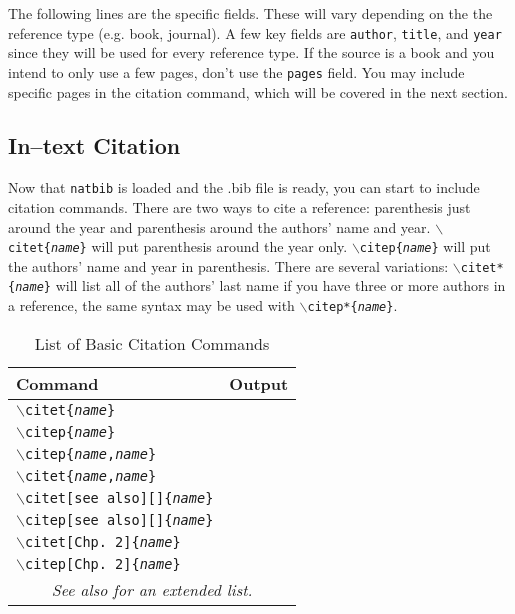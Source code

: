 \documentclass{article}
\begin{document}
The following lines are the specific fields. These will vary depending on the the reference type (e.g. book, journal). A few key fields are \texttt{author}, \texttt{title}, and \texttt{year} since they will be used for every reference type. If the source is a book and you intend to only use a few pages, don't use the \texttt{pages} field. You may include specific pages in the citation command, which will be covered in the next section.

\subsection{In--text Citation}

Now that \texttt{natbib} is loaded and the .bib file is ready, you can start to include citation commands. There are two ways to cite a reference: parenthesis just around the year and parenthesis around the authors' name and year. \texttt{$\backslash$citet\{\textit{name}\}} will put parenthesis around the year only. \texttt{$\backslash$citep\{\textit{name}\}} will put the authors' name and year in parenthesis. There are several variations: \texttt{$\backslash$citet*\{\textit{name}\}} will list all of the authors' last name if you have three or more authors in a reference, the same syntax may be used with \texttt{$\backslash$citep*\{\textit{name}\}}.

\begin{table}[!t]\caption{List of Basic Citation Commands}\label{tbl:cite}
	\begin{tabular}{|l|l|}
	\hline
	Command				& Output \\
	\hline
	\texttt{$\backslash$citet\{\textit{name}\}}								& \citet{Smith01} \\
	\hline
	\texttt{$\backslash$citep\{\textit{name}\}}								& \citep{Smith01} \\
	\hline
	\texttt{$\backslash$citep\{\textit{name},\textit{name}\}}	& \citet{Smith01,Rogers99} \\
	\hline
	\texttt{$\backslash$citet\{\textit{name},\textit{name}\}} & \citep{Smith01,Rogers99} \\
	\hline
	\texttt{$\backslash$citet[see also][]\{\textit{name}\}}		& \citet[see also][]{Smith01} \\
	\hline
	\texttt{$\backslash$citep[see also][]\{\textit{name}\}}		& \citep[see also][]{Smith01} \\
	\hline
	\texttt{$\backslash$citet[Chp. 2]\{\textit{name}\}}				& \citet[Chp. 2]{Smith01} \\
	\hline
	\texttt{$\backslash$citep[Chp. 2]\{\textit{name}\}} 			& \citep[Chp. 2]{Smith01} \\
	\hline
	\multicolumn{2}{|c|}{\textit{See also \citet{Jacobsen} for an extended list.}} \\
	\hline
	\end{tabular}
\end{table}
\end{document}
